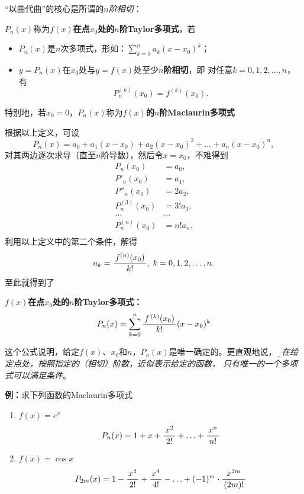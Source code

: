 “以曲代曲”的核心是所谓的{\it $n$阶相切}：

\begin{thx}
	$P_n(x)$称为{\bf $f(x)$在点$x_0$处的$n$阶Taylor多项式}，若
	\begin{itemize}
	  \item $P_n(x)$是$n$次多项式，形如：$\sum\limits_{k=0}^na_k(x-x_0)^k$；
	  \item $y=P_n(x)$在$x_0$处与$y=f(x)$处至少{\bf $n$阶相切}，即
	  对任意$k=0,1,2,\ldots,n$，有
	  $$P^{(k)}_n(x_0)=f^{(k)}(x_0).$$
	\end{itemize}
	特别地，若$x_0=0$，$P_n(x)$称为{\bf $f(x)$的$n$阶Maclaurin多项式}
\end{thx}

根据以上定义，可设
$$P_n(x)=a_0+a_1(x-x_0)+a_2(x-x_0)^2+\ldots+a_n(x-x_0)^n,$$
对其两边逐次求导（直至$n$阶导数），然后令$x=x_0$，不难得到
\begin{align*}
	P_n(x_0)&=a_0,\\
	P'_n(x_0)&=a_1,\\
	P''_n(x_0)&=2a_2,\\
	P^{(3)}_n(x_0)&=3!a_3,\\
	\ldots&\ldots\\
	P^{(n)}_n(x_0)&=n!a_n.\\
\end{align*}
利用以上定义中的第二个条件，解得
$$a_k=\displaystyle\frac{\,{f^{(n)}(x_0)}\,}{\,{k!}\,},\;k=0,1,2,\ldots,n.$$
至此就得到了
\begin{thx}
	{\bf $f(x)$在点$x_0$处的$n$阶Taylor多项式：}
	$$P_n(x)=\sum\limits_{k=0}^n\displaystyle\frac{\,{f^{\,(k)}(x_0)}\,}{\,{k!}\,}(x-x_0)^k$$
\end{thx}
这个公式说明，给定$f(x)$、$x_0$和$n$，$P_n(x)$是唯一确定的。更直观地说，
{\it\b 要在给定点处，按照指定的（相切）阶数，近似表示给定的函数，
只有唯一的一个多项式可以满足条件}。

{\bf 例：}求下列函数的Maclaurin多项式
\begin{enumerate}[(1)]
  \setlength{\itemindent}{1cm}
  \item $f(x)=e^x$ 
  $${P_n(x)=1+x+\displaystyle\frac{\,{x^2}\,}{\,{2!}\,}+\ldots+\displaystyle\frac{\,{x^n}\,}{\,{n!}\,}}$$ 
  \item $f(x)=\cos x$ 
  $${P_{2m}(x)=1-\displaystyle\frac{\,{x^2}\,}{\,{2!}\,}+\displaystyle\frac{\,{x^4}\,}{\,{4!}\,}-\ldots+(-1)^m\cdot\displaystyle\frac{\,{x^{2m}}\,}{\,{(2m)!}\,}}$$
\end{enumerate}

